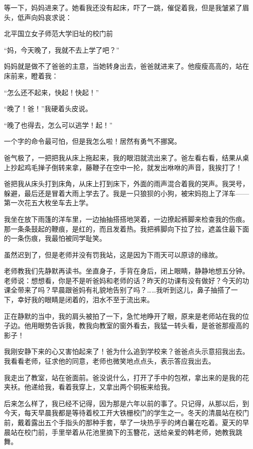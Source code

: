 \par 等一下，妈妈进来了。她看我还没有起床，吓了一跳，催促着我，但是我皱紧了眉头，低声向妈哀求说：
\par 北平国立女子师范大学旧址的校门前
\par “妈，今天晚了，我就不去上学了吧？”
\par 妈妈就是做不了爸爸的主意，当她转身出去，爸爸就进来了。他瘦瘦高高的，站在床前来，瞪着我：
\par “怎么还不起来，快起！快起！”
\par “晚了！爸！”我硬着头皮说。
\par “晚了也得去，怎么可以逃学！起！”
\par 一个字的命令最可怕，但是我怎么啦！居然有勇气不挪窝。
\par 爸气极了，一把把我从床上拖起来，我的眼泪就流出来了。爸左看右看，结果从桌上抄起鸡毛掸子倒转来拿，藤鞭子在空中一抡，就发出咻咻的声音，我挨打了！
\par 爸把我从床头打到床角，从床上打到床下，外面的雨声混合着我的哭声。我哭号，躲避，最后还是冒着大雨上学去了。我是一只狼狈的小狗，被宋妈抱上了洋车——第一次花五大枚坐车去上学。
\par 我坐在放下雨篷的洋车里，一边抽抽搭搭地哭着，一边撩起裤脚来检查我的伤痕。那一条条鼓起的鞭痕，是红的，而且发着热。我把裤脚向下拉了拉，遮盖住最下面的一条伤痕，我最怕被同学耻笑。
\par 虽然迟到了，但是老师并没有罚我站，这是因为下雨天可以原谅的缘故。
\par 老师教我们先静默再读书。坐直身子，手背在身后，闭上眼睛，静静地想五分钟。老师说：想想看，你是不是听爸妈和老师的话？昨天的功课有没有做好？今天的功课全带来了吗？早晨跟爸妈有礼貌地告别了吗？……我听到这儿，鼻子抽搭了一下，幸好我的眼睛是闭着的，泪水不至于流出来。
\par 正在静默的当中，我的肩头被拍了一下，急忙地睁开了眼，原来是老师站在我的位子边。他用眼势告诉我，教我向教室的窗外看去，我猛一转头看，是爸爸那瘦高的影子！
\par 我刚安静下来的心又害怕起来了！爸为什么追到学校来？爸爸点头示意招我出去。我看看老师，征求他的同意，老师也微笑地点点头，表示答应我出去。
\par 我走出了教室，站在爸面前。爸没说什么，打开了手中的包袱，拿出来的是我的花夹袄。他递给我，看着我穿上，又拿出两个铜板来给我。
\par 后来怎么样了，我已经不记得，因为那是六年以前的事了。只记得，从那以后，到今天，每天早晨我都是等待着校工开大铁栅校门的学生之一。冬天的清晨站在校门前，戴着露出五个手指头的那种手套，举了一块热乎乎的烤白薯在吃着。夏天的早晨站在校门前，手里举着从花池里摘下的玉簪花，送给亲爱的韩老师，她教我跳舞。
